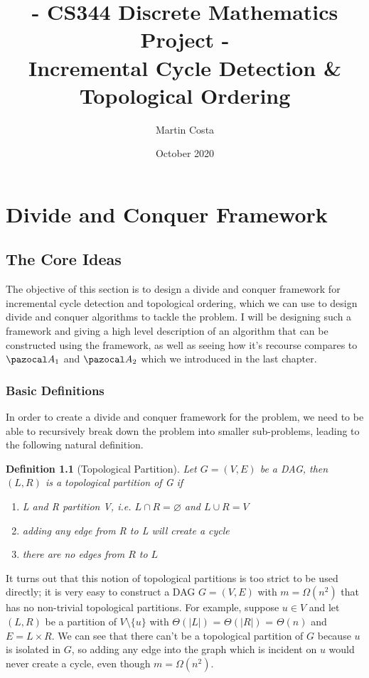\documentclass{report}
\title{- CS344 Discrete Mathematics Project - \\  Incremental Cycle Detection \& Topological Ordering}
\author{Martin Costa}
\date{October 2020}
\newtheorem{definition}[theorem]{Definition}
\begin{document}
\chapter{Divide and Conquer Framework}

\section{The Core Ideas}

The objective of this section is to design a divide and conquer framework for incremental cycle detection and topological ordering, which we can use to design divide and conquer algorithms to tackle the problem. I will be designing such a framework and giving a high level description of an algorithm that can be constructed using the framework, as well as seeing how it's recourse compares to $\pazocal A_1$ and $\pazocal A_2$ which we introduced in the last chapter.

\subsection{Basic Definitions}

In order to create a divide and conquer framework for the problem, we need to be able to recursively break down the problem into smaller sub-problems, leading to the following natural definition.

\begin{definition}[Topological Partition]
Let $G=(V,E)$ be a DAG, then $(L,R)$ is a \textit{topological partition} of G if
\begin{enumerate}
\item L and R partition V, i.e. $L \cap R = \varnothing$ and $L \cup R = V$
\item adding any edge from R to L will create a cycle
\item there are no edges from $R$ to $L$
\end{enumerate}
\end{definition}

It turns out that this notion of topological partitions is too strict to be used directly; it is very easy to construct a DAG $G=(V,E)$ with $m=\Omega (n^{2})$ that has no non-trivial topological partitions. For example, suppose $u \in V$ and let $(L,R)$ be a partition of $V\setminus{\{u\}}$ with $\Theta(\vert L \vert)$ = $\Theta(\vert R \vert)$ = $\Theta(n)$ and $E = L \times R$. We can see that there can't be a topological partition of $G$ because $u$ is isolated in $G$, so adding any edge into the graph which is incident on $u$ would never create a cycle, even though $m=\Omega (n^{2})$.
\end{document}
